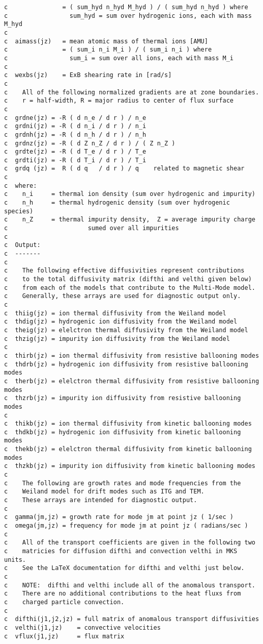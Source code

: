 \begin{verbatim}
c               = ( sum_hyd n_hyd M_hyd ) / ( sum_hyd n_hyd ) where
c                 sum_hyd = sum over hydrogenic ions, each with mass M_hyd
c
c  aimass(jz)   = mean atomic mass of thermal ions [AMU]
c               = ( sum_i n_i M_i ) / ( sum_i n_i ) where
c                 sum_i = sum over all ions, each with mass M_i
c
c  wexbs(jz)    = ExB shearing rate in [rad/s]
c
c    All of the following normalized gradients are at zone boundaries.
c    r = half-width, R = major radius to center of flux surface
c
c  grdne(jz) = -R ( d n_e / d r ) / n_e
c  grdni(jz) = -R ( d n_i / d r ) / n_i
c  grdnh(jz) = -R ( d n_h / d r ) / n_h
c  grdnz(jz) = -R ( d Z n_Z / d r ) / ( Z n_Z )
c  grdte(jz) = -R ( d T_e / d r ) / T_e
c  grdti(jz) = -R ( d T_i / d r ) / T_i
c  grdq (jz) =  R ( d q   / d r ) / q    related to magnetic shear
c
c  where:
c    n_i     = thermal ion density (sum over hydrogenic and impurity)
c    n_h     = thermal hydrogenic density (sum over hydrogenic species)
c    n_Z     = thermal impurity density,  Z = average impurity charge
c                      sumed over all impurities
c
c  Output:
c  -------
c
c    The following effective diffusivities represent contributions
c    to the total diffusivity matrix (difthi and velthi given below)
c    from each of the models that contribute to the Multi-Mode model.
c    Generally, these arrays are used for diagnostic output only.
c
c  thiig(jz) = ion thermal diffusivity from the Weiland model
c  thdig(jz) = hydrogenic ion diffusivity from the Weiland model
c  theig(jz) = elelctron thermal diffusivity from the Weiland model
c  thzig(jz) = impurity ion diffusivity from the Weiland model
c	    
c  thirb(jz) = ion thermal diffusivity from resistive ballooning modes
c  thdrb(jz) = hydrogenic ion diffusivity from resistive ballooning modes
c  therb(jz) = elelctron thermal diffusivity from resistive ballooning modes
c  thzrb(jz) = impurity ion diffusivity from resistive ballooning modes
c	    
c  thikb(jz) = ion thermal diffusivity from kinetic ballooning modes
c  thdkb(jz) = hydrogenic ion diffusivity from kinetic ballooning modes
c  thekb(jz) = elelctron thermal diffusivity from kinetic ballooning modes
c  thzkb(jz) = impurity ion diffusivity from kinetic ballooning modes
c
c    The following are growth rates and mode frequencies from the
c    Weiland model for drift modes such as ITG and TEM.
c    These arrays are intended for diagnostic output.
c
c  gamma(jm,jz) = growth rate for mode jm at point jz ( 1/sec )
c  omega(jm,jz) = frequency for mode jm at point jz ( radians/sec )
c
c    All of the transport coefficients are given in the following two
c    matricies for diffusion difthi and convection velthi in MKS units.
c    See the LaTeX documentation for difthi and velthi just below.
c
c    NOTE:  difthi and velthi include all of the anomalous transport.
c    There are no additional contributions to the heat fluxs from
c    charged particle convection.
c
c  difthi(j1,j2,jz) = full matrix of anomalous transport diffusivities
c  velthi(j1,jz)    = convective velocities
c  vflux(j1,jz)     = flux matrix
\end{verbatim}

